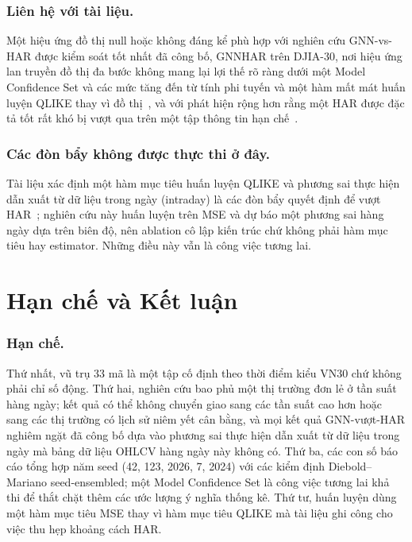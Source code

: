 \documentclass[runningheads]{llncs}
\begin{document}
\subsubsection{Liên hệ với tài liệu.}
Một hiệu ứng đồ thị null hoặc không đáng kể phù hợp với nghiên cứu GNN-vs-HAR được kiểm soát tốt nhất đã
công bố, GNNHAR trên DJIA-30, nơi hiệu ứng lan truyền đồ thị đa bước không mang lại lợi thế rõ ràng dưới
một Model Confidence Set và các mức tăng đến từ tính phi tuyến và một hàm mất mát huấn luyện QLIKE thay vì
đồ thị~\cite{zhang2025gnnhar}, và với phát hiện rộng hơn rằng một HAR được đặc tả tốt rất khó bị vượt qua
trên một tập thông tin hạn chế~\cite{audrino2025}.

\subsubsection{Các đòn bẩy không được thực thi ở đây.}
Tài liệu xác định một hàm mục tiêu huấn luyện QLIKE và phương sai thực hiện dẫn xuất từ dữ liệu trong ngày
(intraday) là các đòn bẩy quyết định để vượt HAR~\cite{zhang2025gnnhar}; nghiên cứu này huấn luyện trên
MSE và dự báo một phương sai hàng ngày dựa trên biên độ, nên ablation cô lập kiến trúc chứ không phải hàm
mục tiêu hay estimator. Những điều này vẫn là công việc tương lai.

\section{Hạn chế và Kết luận}
\label{sec:conclusion}

\subsubsection{Hạn chế.}
Thứ nhất, vũ trụ 33 mã là một tập cố định theo thời điểm kiểu VN30 chứ không phải chỉ số động. Thứ hai,
nghiên cứu bao phủ một thị trường đơn lẻ ở tần suất hàng ngày; kết quả có thể không chuyển giao sang các
tần suất cao hơn hoặc sang các thị trường có lịch sử niêm yết cân bằng, và mọi kết quả GNN-vượt-HAR
nghiêm ngặt đã công bố dựa vào phương sai thực hiện dẫn xuất từ dữ liệu trong ngày mà bảng dữ liệu OHLCV
hàng ngày này không có. Thứ ba, các con số báo cáo tổng hợp năm seed (42, 123, 2026, 7, 2024) với các
kiểm định Diebold--Mariano seed-ensembled; một Model Confidence Set là công việc tương lai khả thi để
thắt chặt thêm các ước lượng ý nghĩa thống kê. Thứ tư, huấn luyện dùng một hàm mục tiêu MSE thay vì hàm
mục tiêu QLIKE mà tài liệu ghi công cho việc thu hẹp khoảng cách HAR.
\end{document}
